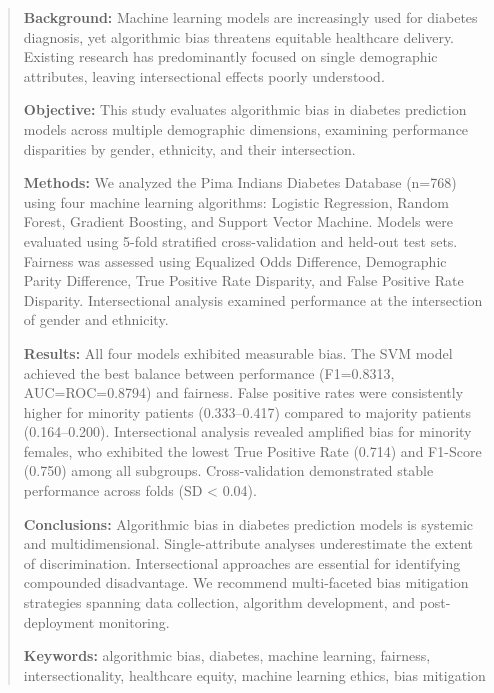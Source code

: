 
\begin{abstract}
\noindent
\textbf{Background:} Machine learning models are increasingly used for 
diabetes diagnosis, yet algorithmic bias threatens equitable healthcare 
delivery. Existing research has predominantly focused on single demographic 
attributes, leaving intersectional effects poorly understood.

\textbf{Objective:} This study evaluates algorithmic bias in diabetes 
prediction models across multiple demographic dimensions, examining 
performance disparities by gender, ethnicity, and their intersection.

\textbf{Methods:} We analyzed the Pima Indians Diabetes Database (n=768) 
using four machine learning algorithms: Logistic Regression, Random Forest, 
Gradient Boosting, and Support Vector Machine. Models were evaluated using 
5-fold stratified cross-validation and held-out test sets. Fairness was 
assessed using Equalized Odds Difference, Demographic Parity Difference, 
True Positive Rate Disparity, and False Positive Rate Disparity. 
Intersectional analysis examined performance at the intersection of gender 
and ethnicity.

\textbf{Results:} All four models exhibited measurable bias. The SVM model 
achieved the best balance between performance (F1=0.8313, AUC=ROC=0.8794) 
and fairness. False positive rates were consistently higher for minority 
patients (0.333--0.417) compared to majority patients (0.164--0.200). 
Intersectional analysis revealed amplified bias for minority females, who 
exhibited the lowest True Positive Rate (0.714) and F1-Score (0.750) among 
all subgroups. Cross-validation demonstrated stable performance across folds 
(SD < 0.04).

\textbf{Conclusions:} Algorithmic bias in diabetes prediction models is 
systemic and multidimensional. Single-attribute analyses underestimate 
the extent of discrimination. Intersectional approaches are essential for 
identifying compounded disadvantage. We recommend multi-faceted bias 
mitigation strategies spanning data collection, algorithm development, 
and post-deployment monitoring.

\noindent
\textbf{Keywords:} algorithmic bias, diabetes, machine learning, fairness, 
intersectionality, healthcare equity, machine learning ethics, bias 
mitigation
\end{abstract}

